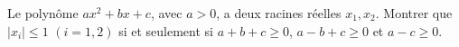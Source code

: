 Le polynôme $ax^2 + bx + c$, avec $a > 0$, a deux racines réelles $x_1, x_2$. Montrer que $|x_i| \leq 1$ $(i = 1, 2)$ si et seulement si $a + b + c \geq 0$, $a - b + c \geq 0$ et $a - c \geq 0$.
